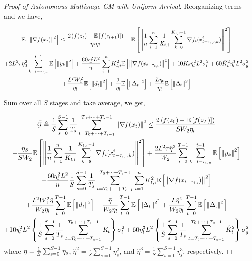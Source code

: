 \begin{proof}[Proof of Autonomous Multistage GM with Uniform Arrival]
Reorganizing terms and we have,

\begin{equation}
\begin{gathered}
 \mathbb{E}\left[\left\| \nabla f(x_t) \right\|^2\right]  \leq \frac{2\left(f(z_t) - \mathbb{E}\left[f(z_{t+1})\right]  \right)}{\eta_t\eta_l} - \mathbb{E}\left[\left\| \frac{1}{n}\sum_{i=1}^n \frac{1}{K_{t,i}} \sum_{k=0}^{K_{t,i}-1} \nabla f_i(x_{t-\tau_{t,i},k}^i) \right\|^2\right]\\
+ 2 L^2 \tau \eta_0^2 \sum_{k=t-\tau_{t,u}}^{t-1}\mathbb{E}\left[\left\|  y_k \right\|^2\right] 
+ \frac{60 \eta_l^2 L^2}{n}\sum_{i=1}^n K_{t,i}^2\mathbb{E}\left[\left\| \nabla f(x_{t-\tau_{t,i}})\right\|^2\right] + 10 \Bar{K}_t  \eta^2_l L^2 \sigma_l^2 + 60 \hat{K}_t^2 \eta^2_l L^2 \sigma_g^2\\
+ \frac{L^2 W_1^2}{\eta_l} \mathbb{E}\left[\left\| d_t\right\|^2\right] + \frac{1}{\eta_l}\mathbb{E}\left[\left\|\Delta_t\right\|^2\right]  + \frac{L\eta_t}{\eta_l}  \mathbb{E}\left[\left\| \Delta_t\right\|^2\right]
\end{gathered}\nonumber
\end{equation}

Sum over all $S$ stages and take average, we get,

\begin{equation}
\begin{gathered}
\Bar{\mathcal{G}}\triangleq\frac{1}{S}\sum_{s=0}^{S-1} \frac{1}{T_s}\sum_{t=T_0+\dots+T_{s-1} }^{T_0+\dots+T_s-1} \left\|\nabla f(x_t)\right\|^2
\leq \frac{2\left(f(z_0) - \mathbb{E}\left[f(z_{T})\right]  \right)}{S W_2 \eta_l} \\
- \frac{\eta_S}{S W_2} \mathbb{E}\left[\left\| \frac{1}{n}\sum_{i=1}^n \frac{1}{K_{t,i}} \sum_{k=0}^{K_{t,i}-1} \nabla f_i(x_{t-\tau_{t,i},k}^i) \right\|^2\right]
+  \frac{2 L^2 \tau \hat{\eta}^3}{W_2} \sum_{t=0}^{T-1} \sum_{k=t-\tau_{t,u}}^{t-1}\mathbb{E}\left[\left\|  y_k \right\|^2\right] \\
+ \frac{60 \eta_l^2 L^2}{n} \frac{1}{S}\sum_{s=0}^{S-1} \frac{1}{T_s}\sum_{t=T_0+\dots+T_{s-1} }^{T_0+\dots+T_s-1} \sum_{i=1}^n K_{t,i}^2\mathbb{E}\left[\left\| \nabla f(x_{t-\tau_{t,i}})\right\|^2\right] \\
+ \frac{L^2 W_1^2 \Bar{\eta}}{ W_2 \eta_l} \sum_{t=0}^{T-1}\mathbb{E}\left[\left\| d_t\right\|^2\right] + \frac{\Bar{\eta}}{ W_2 \eta_l} \sum_{t=0}^{T-1} \mathbb{E}\left[\left\|\Delta_t\right\|^2\right]  + \frac{L \hat{\eta}^2}{W_2 \eta_l} \sum_{t=0}^{T-1} \mathbb{E}\left[\left\| \Delta_t\right\|^2\right]\\
+ 10  \eta^2_l L^2 \left\{\frac{1}{S}\sum_{s=0}^{S-1} \frac{1}{T_s}\sum_{t=T_0+\dots+T_{s-1} }^{T_0+\dots+T_s-1} \Bar{K}_t\right\} \sigma_l^2 + 60 \eta^2_l L^2 \left\{\frac{1}{S}\sum_{s=0}^{S-1} \frac{1}{T_s}\sum_{t=T_0+\dots+T_{s-1} }^{T_0+\dots+T_s-1} \hat{K}_t^2 \right\} \sigma_g^2
\end{gathered}\nonumber
\end{equation}
where $\Bar{\eta}=\frac{1}{S}\sum_{s=0}^{S-1}\eta_s$, $\hat{\eta}^2=\frac{1}{S}\sum_{s=0}^{S-1}\eta^2_s$, and $\hat{\eta}^3=\frac{1}{S}\sum_{s=0}^{S-1}\eta^3_s$, respectively.



\end{proof}
